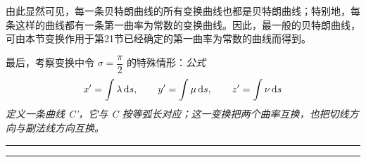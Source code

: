 由此显然可见，每一条贝特朗曲线的所有变换曲线也都是贝特朗曲线；特别地，每条这样的曲线都有一条第一曲率为常数的变换曲线。因此，最一般的贝特朗曲线，可由本节变换作用于第21节已经确定的第一曲率为常数的曲线而得到。

最后，考察变换中令 \(\sigma=\dfrac{\pi}{2}\) 的特殊情形：\emph{公式}
\[
x'=\int\lambda\,\mathrm{d} s,
\qquad y'=\int\mu\,\mathrm{d} s,
\qquad z'=\int\nu\,\mathrm{d} s
\]
\emph{定义一条曲线 C'，它与 C 按等弧长对应；这一变换把两个曲率互换，也把切线方向与副法线方向互换。}
\begin{center}
\rule{1.25em}{0.4pt}\hspace{0.18em}\raisebox{0.15ex}{$\bullet\!\bullet\!\bullet\!\bullet$}\hspace{0.18em}\rule{1.25em}{0.4pt}
\end{center}



\providecommand{\chrone}[3]{\left[\begin{matrix}#1\ #2\\ #3\end{matrix}\right]}
\providecommand{\chrtwo}[3]{\left\{\begin{matrix}#1\ #2\\ #3\end{matrix}\right\}}
